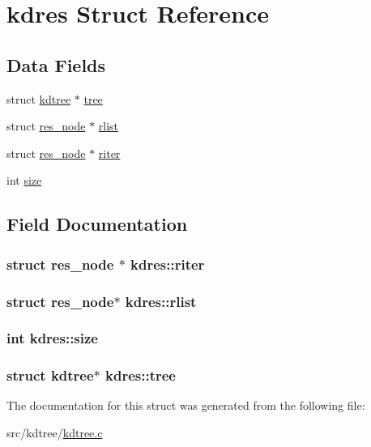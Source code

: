 \hypertarget{structkdres}{\section{kdres Struct Reference}
\label{structkdres}
}
\subsection*{Data Fields}
\begin{DoxyCompactItemize}
\item 
struct \hyperlink{structkdtree}{kdtree} $\ast$ \hyperlink{structkdres_a76eebf2c192b36e4ee8a320969f02b13}{tree}
\item 
struct \hyperlink{structres__node}{res\+\_\+node} $\ast$ \hyperlink{structkdres_a032943193c899506e0ca421fc2b0a26f}{rlist}
\item 
struct \hyperlink{structres__node}{res\+\_\+node} $\ast$ \hyperlink{structkdres_a5ea11c977a467694481b4c0fbb5befa1}{riter}
\item 
int \hyperlink{structkdres_a7ac4f6162e557c880476f7ca024ce946}{size}
\end{DoxyCompactItemize}


\subsection{Field Documentation}
\hypertarget{structkdres_a5ea11c977a467694481b4c0fbb5befa1}{
\subsubsection[{riter}]{\setlength{\rightskip}{0pt plus 5cm}struct {\bf res\+\_\+node} $\ast$ kdres\+::riter}}\label{structkdres_a5ea11c977a467694481b4c0fbb5befa1}
\hypertarget{structkdres_a032943193c899506e0ca421fc2b0a26f}{
\subsubsection[{rlist}]{\setlength{\rightskip}{0pt plus 5cm}struct {\bf res\+\_\+node}$\ast$ kdres\+::rlist}}\label{structkdres_a032943193c899506e0ca421fc2b0a26f}
\hypertarget{structkdres_a7ac4f6162e557c880476f7ca024ce946}{
\subsubsection[{size}]{\setlength{\rightskip}{0pt plus 5cm}int kdres\+::size}}\label{structkdres_a7ac4f6162e557c880476f7ca024ce946}
\hypertarget{structkdres_a76eebf2c192b36e4ee8a320969f02b13}{
\subsubsection[{tree}]{\setlength{\rightskip}{0pt plus 5cm}struct {\bf kdtree}$\ast$ kdres\+::tree}}\label{structkdres_a76eebf2c192b36e4ee8a320969f02b13}


The documentation for this struct was generated from the following file\+:\begin{DoxyCompactItemize}
\item 
src/kdtree/\hyperlink{kdtree_8c}{kdtree.\+c}\end{DoxyCompactItemize}
